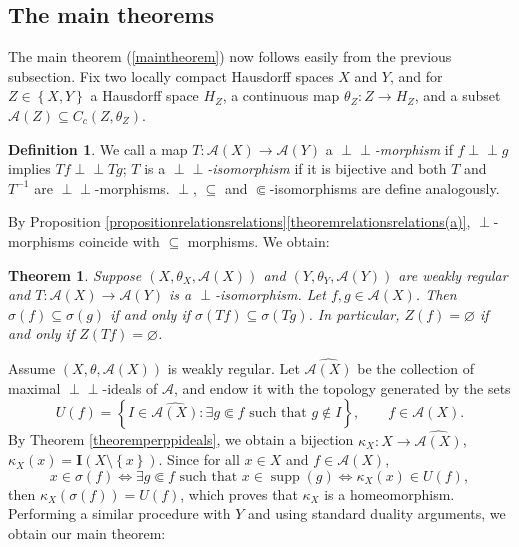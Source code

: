 \documentclass[letter,11pt]{amsart}
\theoremstyle{plain}		\newtheorem{theorem}[generalnumbering]{Theorem}
\theoremstyle{plain}		\newtheorem{corollary}[generalnumbering]{Corollary}
\theoremstyle{definition}		\newtheorem{definition}[generalnumbering]{Definition}
\theoremstyle{definition}		\newtheorem{example}[generalnumbering]{Example}
\theoremstyle{plain}		\newtheorem{proposition}[generalnumbering]{Proposition}
\theoremstyle{plain}		\newtheorem{lemma}[generalnumbering]{Lemma}
\theoremstyle{definition}
\newcommand{\perpp}{\perp\!\!\!\perp}
\DeclareMathOperator{\supp}{supp}
\begin{document}
\subsection{The main theorems}
The main theorem (\ref{maintheorem}) now follows easily from the previous subsection. Fix two locally compact Hausdorff spaces $X$ and $Y$, and for $Z\in\left\{X,Y\right\}$ a Hausdorff space $H_Z$, a continuous map $\theta_Z\colon Z\to H_Z$, and a subset $\mathcal{A}(Z)\subseteq C_c(Z,\theta_Z)$.

\begin{definition}
	We call a map $T\colon\mathcal{A}(X)\to\mathcal{A}(Y)$ a \emph{$\perpp$-morphism} if $f\perpp g$ implies $Tf\perpp Tg$; $T$ is a \emph{$\perpp$-isomorphism} if it is bijective and both $T$ and $T^{-1}$ are $\perpp$-morphisms. $\perp$, $\subseteq$ and $\Subset$-isomorphisms are define analogously.\index{$\perpp$-morphism}
\end{definition}

By Proposition \ref{propositionrelationsrelations}\ref{theoremrelationsrelations(a)}, $\perp$-morphisms coincide with $\subseteq$ morphisms. We obtain:

\begin{theorem}\label{theoremdisjoint}
	Suppose $(X,\theta_X,\mathcal{A}(X))$ and $(Y,\theta_Y,\mathcal{A}(Y))$ are weakly regular and $T\colon\mathcal{A}(X)\to\mathcal{A}(Y)$ is a $\perp$-isomorphism. Let $f,g\in\mathcal{A}(X)$. Then $\sigma(f)\subseteq \sigma(g)$ if and only if $\sigma(Tf)\subseteq \sigma(Tg)$. In particular, $Z(f)=\varnothing$ if and only if $Z(Tf)=\varnothing$.
\end{theorem}

Assume $(X,\theta,\mathcal{A}(X))$ is weakly regular. Let $\widehat{\mathcal{A}(X)}$ be the collection of maximal $\perpp$-ideals of $\mathcal{A}$, and endow it with the topology generated by the sets
\[U(f)=\left\{I\in\widehat{\mathcal{A}(X)}:\exists g\Subset f\text{ such that }g\not\in I\right\},\qquad f\in\mathcal{A}(X).\]
By Theorem \ref{theoremperppideals}, we obtain a bijection $\kappa_X\colon X\to\widehat{\mathcal{A}(X)}$, $\kappa_X(x)=\mathbf{I}(X\setminus\left\{x\right\})$. Since for all $x\in X$ and $f\in\mathcal{A}(X)$,
\[x\in\sigma(f)\iff\exists g\Subset f\text{ such that } x\in\supp(g)\iff\kappa_X(x)\in U(f),\]
then $\kappa_X(\sigma(f))=U(f)$, which proves that $\kappa_X$ is a homeomorphism. Performing a similar procedure  with $Y$ and using standard duality arguments, we obtain our main theorem:
\end{document}
